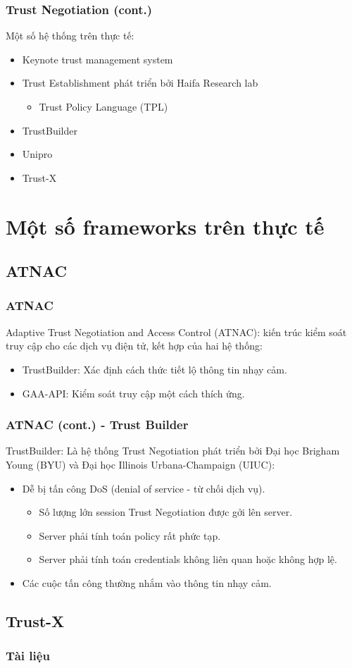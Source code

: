 \documentclass[11pt]{beamer}
\begin{document}
\begin{frame}
\frametitle{Trust Negotiation (cont.)}
Một số hệ thống trên thực tế:
\begin{itemize}
\item Keynote trust management system
\item Trust Establishment phát triển bởi Haifa Research lab
\begin{itemize}
\item Trust Policy Language (TPL)
\end{itemize}
\item TrustBuilder
\item Unipro
\item Trust-X
\end{itemize}
\end{frame}

\section{Một số frameworks trên thực tế}
\subsection{ATNAC}
\begin{frame}
\frametitle{ATNAC}
Adaptive Trust Negotiation and Access Control (ATNAC)\cite{10.1145/1063979.1064004}: kiến trúc kiểm soát truy cập cho các dịch vụ điện tử, kết hợp của hai hệ thống:
\begin{itemize}
\item TrustBuilder: Xác định cách thức tiết lộ thông tin nhạy cảm.
\item GAA-API: Kiểm soát truy cập một cách thích ứng.
\end{itemize}
\end{frame}

\begin{frame}
\frametitle{ATNAC (cont.) - Trust Builder}
TrustBuilder: Là hệ thống Trust Negotiation phát triển bởi Đại học Brigham Young (BYU) và Đại học Illinois Urbana-Champaign (UIUC):
\begin{itemize}
\item Dễ bị tấn công DoS (denial of service - từ chối dịch vụ).
\begin{itemize}
\item Số lượng lớn session Trust Negotiation được gởi lên server.
\item Server phải tính toán policy rất phức tạp.
\item Server phải tính toán credentials không liên quan hoặc không hợp lệ.
\end{itemize}
\item Các cuộc tấn công thường nhắm vào thông tin nhạy cảm.
\end{itemize}
\end{frame}

\subsection{Trust-X}

\begin{frame}
\frametitle{Tài liệu}
\printbibliography
\end{frame}
\end{document}
